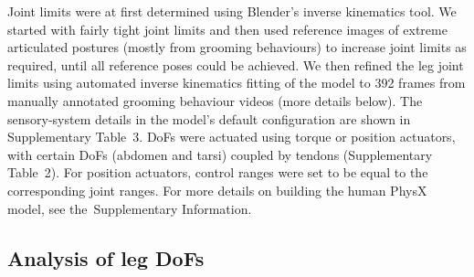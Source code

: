 \documentclass[sn-mathphys-num]{sn-jnl}%
\theoremstyle{thmstyleone}%
\theoremstyle{thmstyletwo}%
\theoremstyle{thmstylethree}%
\begin{document}
Joint limits were at first determined using Blender's inverse kinematics tool. 
We started with fairly tight joint limits and then used reference images of extreme articulated postures (mostly from grooming behaviours) to increase joint limits as required, until all reference poses could be achieved. 
We then refined the leg joint limits using automated inverse kinematics fitting of the model to 392 frames from manually annotated grooming behaviour videos (more details below). 
The sensory-system details in the model's default configuration are shown in Supplementary Table 3. 
DoFs were actuated using torque or position actuators, with certain DoFs (abdomen and tarsi) coupled by tendons (Supplementary Table 2). 
For position actuators, control ranges were set to be equal to the corresponding joint ranges. 
For more details on building the human PhysX model, see the Supplementary Information.


\subsection{Analysis of leg DoFs} \label{sec:HCP_data}
\end{document}
